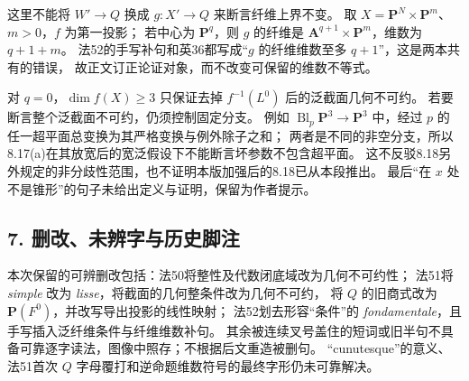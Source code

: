这里不能将 $W'\to Q$ 换成 $g:X'\to Q$ 来断言纤维上界不变。
取 $X=\mathbf P^N\times\mathbf P^m$、$m>0$，$f$ 为第一投影；
若中心为 $\mathbf P^q$，则 $g$ 的纤维是
$\mathbf A^{q+1}\times\mathbf P^m$，维数为 $q+1+m$。
法52的手写补句和英36都写成“$g$ 的纤维维数至多 $q+1$”，这是两本共有的错误，
故正文订正论证对象，而不改变可保留的维数不等式。

对 $q=0$，$\dim f(X)\ge3$ 只保证去掉 $f^{-1}(L^0)$ 后的泛截面几何不可约。
若要断言整个泛截面不可约，仍须控制固定分支。
例如 $\operatorname{Bl}_p\mathbf P^3\to\mathbf P^3$ 中，经过 $p$ 的任一超平面总变换为其严格变换与例外除子之和；
两者是不同的非空分支，所以8.17(a)在其放宽后的宽泛假设下不能断言坏参数不包含超平面。
这不反驳8.18另外规定的非分歧性范围，也不证明本版加强后的8.18已从本段推出。
最后“在 $x$ 处不是锥形”的句子未给出定义与证明，保留为作者提示。

\subsection*{7. 删改、未辨字与历史脚注}

本次保留的可辨删改包括：法50将整性及代数闭底域改为几何不可约性；
法51将 \emph{simple} 改为 \emph{lisse}，将截面的几何整条件改为几何不可约，
将 $Q$ 的旧商式改为 $\mathbf P(F^0)$，并改写导出投影的线性映射；
法52划去形容“条件”的 \emph{fondamentale}，且手写插入泛纤维条件与纤维维数补句。
其余被连续叉号盖住的短词或旧半句不具备可靠逐字读法，图像中照存；不根据后文重造被删句。
“cunutesque”的意义、法51首次 $Q$ 字母覆打和逆命题维数符号的最终字形仍未可靠解决。

